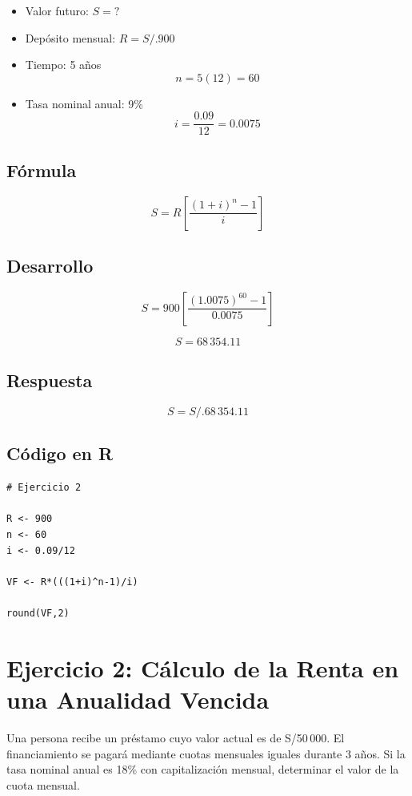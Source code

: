 \documentclass[12pt]{article}
\begin{document}
\begin{itemize}
\item Valor futuro: \(S=?\)
\item Depósito mensual: \(R=S/.900\)
\item Tiempo: 5 años
\[
n=5(12)=60
\]
\item Tasa nominal anual: 9\%
\[
i=\frac{0.09}{12}=0.0075
\]
\end{itemize}

\subsection*{Fórmula}

\[
S=R\left[\frac{(1+i)^n-1}{i}\right]
\]

\subsection*{Desarrollo}

\[
S=900\left[\frac{(1.0075)^{60}-1}{0.0075}\right]
\]

\[
S=68\,354.11
\]

\subsection*{Respuesta}

\[
\boxed{S=S/.68\,354.11}
\]

\subsection*{Código en R}

\begin{lstlisting}
# Ejercicio 2

R <- 900
n <- 60
i <- 0.09/12

VF <- R*(((1+i)^n-1)/i)

round(VF,2)
\end{lstlisting}

\newpage

\section*{Ejercicio 2: Cálculo de la Renta en una Anualidad Vencida}

Una persona recibe un préstamo cuyo valor actual es de S/50\,000. El financiamiento se pagará mediante cuotas mensuales iguales durante 3 años. Si la tasa nominal anual es 18\% con capitalización mensual, determinar el valor de la cuota mensual.
\end{document}
